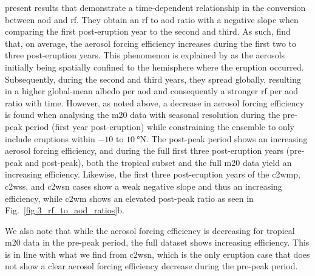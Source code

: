 \documentclass{ametsocV6.1}
\begin{document}
\citet[][their Fig.\ 1c,d]{marshall2020} present results that demonstrate a
time-dependent relationship in the conversion between \gls{aod} and \gls{rf}. They
obtain an \gls{rf} to \gls{aod} ratio with a negative slope when comparing the first
post-eruption year to the second and third. As such, \citet{marshall2020} find that, on
average, the aerosol forcing efficiency increases during the first two to three
post-eruption years. This phenomenon is explained by \citet{marshall2020} as the
aerosols initially being spatially confined to the hemisphere where the eruption
occurred. Subsequently, during the second and third years, they spread globally,
resulting in a higher global-mean albedo per \gls{aod} and consequently a stronger
\gls{rf} per \gls{aod} ratio with time. However, as noted above, a decrease in aerosol
forcing efficiency is found when analysing the \gls{m20} data with seasonal resolution
during the pre-peak period (first year post-eruption) while constraining the ensemble to
only include eruptions within \(-10\) to \(\SI{10}{\degree\mathrm{N}}\). The post-peak
period shows an increasing aerosol forcing efficiency, and during the full first three
post-eruption years (pre-peak and post-peak), both the tropical subset and the full
\gls{m20} data yield an increasing efficiency. Likewise, the first three post-eruption
years of the \gls{c2wmp}, \gls{c2wss}, and \gls{c2wsn} cases show a weak negative slope
and thus an increasing efficiency, while \gls{c2wm} shows an elevated post-peak ratio as
seen in Fig.~\ref{fig:3_rf_to_aod_ratios}b.

We also note that while the aerosol forcing efficiency is decreasing for tropical
\gls{m20} data in the pre-peak period, the full dataset shows increasing efficiency.
This is in line with what we find from \gls{c2wsn}, which is the only eruption case that
does not show a clear aerosol forcing efficiency decrease during the pre-peak period.
\end{document}
